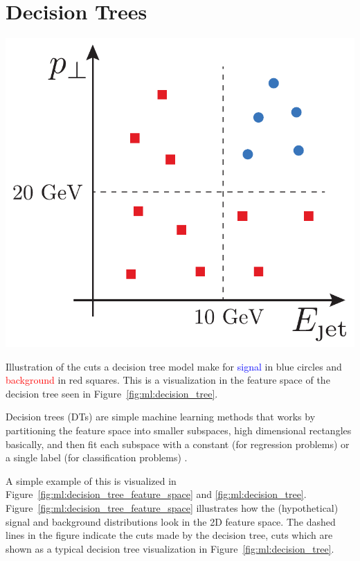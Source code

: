 \section{Decision Trees}
\label{sec:ml:decision_trees}

\begin{marginfigure}
  \includegraphics[width=\textwidth, trim=5 5 5 5, clip]{figures/decision_tree/tree_example.pdf}%
  \caption[Decision Tree Cuts In Feature Space]{Illustration of the cuts a decision tree model make for \textcolor{blue}{signal} in blue circles and \textcolor{red}{background} in red squares. This is a visualization in the feature space of the decision tree seen in Figure~\ref{fig:ml:decision_tree}.}
  \label{fig:ml:decision_tree_feature_space}
\end{marginfigure}

Decision trees (DTs) are simple machine learning methods that works by partitioning the feature space into smaller subspaces, high dimensional rectangles basically, and then fit each subspace with a constant (for regression problems) or a single label (for classification problems) \citep{hastieElementsStatisticalLearning2009}. 

A simple example of this is visualized in Figure~\ref{fig:ml:decision_tree_feature_space} and \ref{fig:ml:decision_tree}. Figure~\ref{fig:ml:decision_tree_feature_space} illustrates how the (hypothetical) signal and background distributions look in the 2D feature space. The dashed lines in the figure indicate the cuts made by the decision tree, cuts which are shown as a typical decision tree visualization in Figure~\ref{fig:ml:decision_tree}. 


